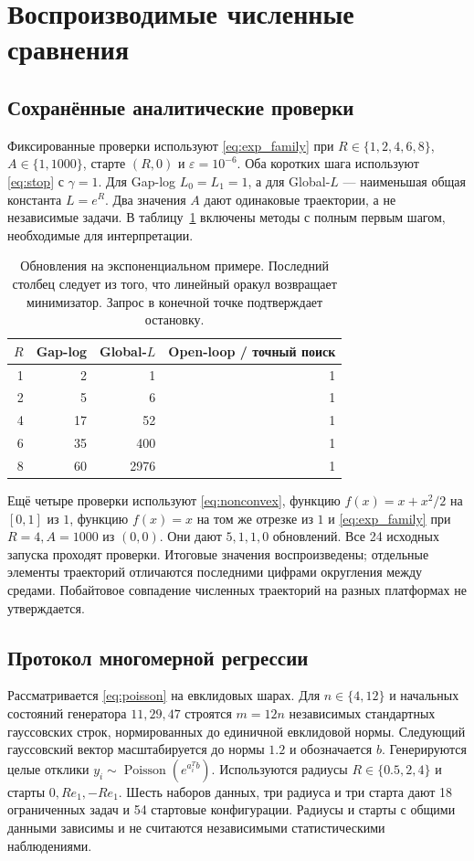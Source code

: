 \section{Воспроизводимые численные сравнения}\label{sec:experiments}
\subsection{Сохранённые аналитические проверки}
Фиксированные проверки используют \eqref{eq:exp_family} при
$R\in\{1,2,4,6,8\}$, $A\in\{1,1000\}$, старте $(R,0)$ и
$\varepsilon=10^{-6}$. Оба коротких шага используют \eqref{eq:stop}
с $\gamma=1$. Для Gap-log $L_0=L_1=1$, а для Global-$L$ ---
наименьшая общая константа $L=e^R$. Два значения $A$ дают одинаковые
траектории, а не независимые задачи. В таблицу~\ref{tab:endpoint}
включены методы с полным первым шагом, необходимые для интерпретации.
\begin{table}[ht]
\centering
\caption{Обновления на экспоненциальном примере. Последний столбец
следует из того, что линейный оракул возвращает минимизатор.
Запрос в конечной точке подтверждает остановку.}\label{tab:endpoint}
\begin{tabular}{rrrr}
\toprule
$R$ & Gap-log & Global-$L$ & Open-loop / точный поиск\\
\midrule
1 & 2 & 1 & 1\\
2 & 5 & 6 & 1\\
4 & 17 & 52 & 1\\
6 & 35 & 400 & 1\\
8 & 60 & 2976 & 1\\
\bottomrule
\end{tabular}
\end{table}
Ещё четыре проверки используют \eqref{eq:nonconvex}, функцию
$f(x)=x+x^2/2$ на $[0,1]$ из $1$, функцию $f(x)=x$ на том же
отрезке из $1$ и \eqref{eq:exp_family} при $R=4,A=1000$ из $(0,0)$.
Они дают $5,1,1,0$ обновлений. Все 24 исходных запуска проходят
проверки. Итоговые значения воспроизведены; отдельные элементы
траекторий отличаются последними цифрами округления между средами.
Побайтовое совпадение численных траекторий на разных платформах
не утверждается.

\subsection{Протокол многомерной регрессии}
Рассматривается \eqref{eq:poisson} на евклидовых шарах. Для
$n\in\{4,12\}$ и начальных состояний генератора $11,29,47$
строятся $m=12n$ независимых стандартных гауссовских строк,
нормированных до единичной евклидовой нормы. Следующий гауссовский
вектор масштабируется до нормы $1.2$ и обозначается $b$.
Генерируются целые отклики $y_i\sim\operatorname{Poisson}(e^{a_i^Tb})$.
Используются радиусы $R\in\{0.5,2,4\}$ и старты $0,Re_1,-Re_1$.
Шесть наборов данных, три радиуса и три старта дают 18 ограниченных
задач и 54 стартовые конфигурации. Радиусы и старты с общими данными
зависимы и не считаются независимыми статистическими наблюдениями.

